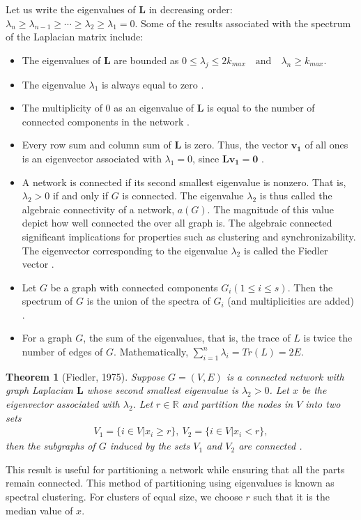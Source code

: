 \documentclass[10pt,a4paper]{article}
\newtheorem{thm}{Theorem}
\begin{document}
Let us write the eigenvalues of $\mathbf{L}$ in decreasing order: $\lambda_n  \geq \lambda_{n-1} \geq  \cdots \geq \lambda_2 \geq \lambda_1 =0 $. Some of the results associated with the spectrum of the Laplacian matrix include:
\begin{itemize}
	\item The eigenvalues of $\mathbf{L}$ are bounded as 
	$ 0 \leq \lambda_j \leq 2k_{max} \quad \text{and} \quad \lambda_n \geq k_{max} $.
	\item The eigenvalue $\lambda_1$ is always equal to zero \citep{estrada2011structure}.
	\item The multiplicity of $0$ as an eigenvalue of $\mathbf{L}$ is equal to the number of connected components in the network \citep{estrada2011structure}.
	\item Every row sum and column sum of $\mathbf{L}$ is zero. Thus, the vector $\mathbf{v_1}$ of all ones is an eigenvector associated with $\lambda_1 =0$, since $\mathbf{Lv_1} = \mathbf{0} $ \citep{das2004laplacian}.
	\item  A network is connected if its second smallest eigenvalue is nonzero. That is, $\lambda_2> 0$ if and only if $G$ is connected. The eigenvalue $\lambda_2$ is thus called the algebraic connectivity of a network, $a(G)$. The magnitude of this value depict how well connected  the over all graph is. The algebraic connected significant implications for properties such as clustering and synchronizability.
	The eigenvector corresponding to the eigenvalue $\lambda_2$ is called the Fiedler vector \citep{estrada2015first}.
	
	\item Let $G$ be a graph with connected components $G_i (1 \leq i \leq s)$. Then the spectrum of $G$ is the union of the spectra of $G_i$ (and multiplicities are added) \citep{brouwer2011spectra}.
	
	\item For a graph $G$, the sum of the eigenvalues, that is, the trace of $L$ is twice the number of edges of $G$. Mathematically, $\sum_{i=1}^n \lambda_i = Tr(L) = 2E.$
	
\end{itemize}


\begin{thm}[Fiedler, 1975]
	Suppose $G = (V,E)$ is a connected network with graph Laplacian $\mathbf{L}$ whose second smallest eigenvalue is $\lambda_2 > 0$. Let $x$ be the eigenvector associated with $\lambda_2$. Let $r \in \mathbb{R}$ and partition the nodes in $V$ into two sets
	\begin{eqnarray}
	V_1 = \{i \in V|x_i \geq r\}, ~ V_2 = \{i \in V | x_i < r\}, 
	\end{eqnarray}
	then the subgraphs of $G$ induced by the sets $V_1$ and $V_2$ are connected \citep{estrada2015first}.
	\label{fiedler}
\end{thm}
This result is useful for partitioning a network while ensuring that all the parts remain connected. This method of partitioning using eigenvalues is known as spectral clustering. For clusters of equal size, we choose $r$ such that it is the median value of $x$. 
\end{document}
